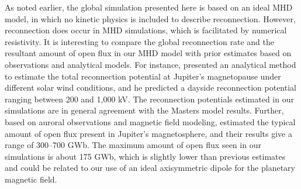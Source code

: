 As noted earlier, the global simulation presented here is based on an ideal MHD model, in which no kinetic physics is included to describe reconnection. However, reconnection does occur in MHD simulations, which is facilitated by numerical resistivity. It is interesting to compare the global reconnection rate and the resultant amount of open flux in our MHD model with prior estimates based on observations and analytical models. For instance,  presented an analytical method to estimate the total reconnection potential at Jupiter's magnetopause under different solar wind conditions, and he predicted a dayside reconnection potential ranging between 200 and 1,000 kV. The reconnection potentials estimated in our simulations are in general agreement with the Masters model results. Further, based on auroral observations and magnetic field modeling,  estimated the typical amount of open flux present in Jupiter's magnetosphere, and their results give a range of 300–700 GWb. The maximum amount of open flux seen in our simulations is about 175 GWb, which is slightly lower than previous estimates and could be related to our use of an ideal axisymmetric dipole for the planetary magnetic field.